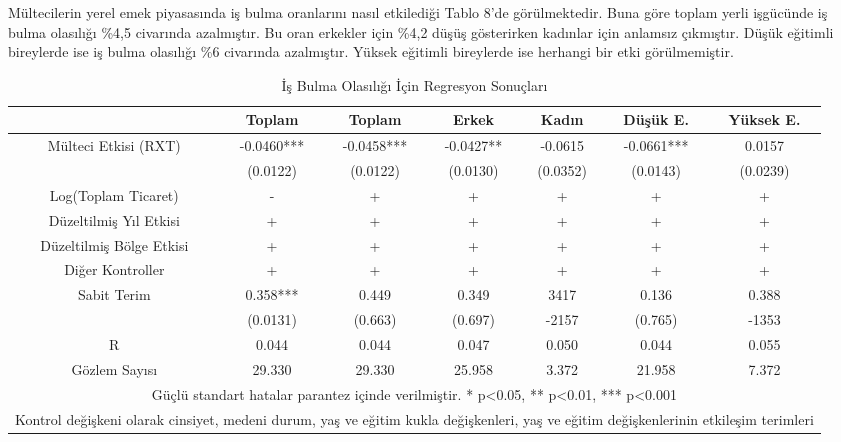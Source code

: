 \documentclass{article}
\begin{document}
\begin{justify}
\begin{table}[h]
\begin{tabular}{|ccccccc|}
                \end{tabular}
        \end{table}
        \FloatBarrier

        Mültecilerin yerel emek piyasasında iş bulma oranlarını nasıl etkilediği Tablo 8'de görülmektedir.
        Buna göre toplam yerli işgücünde iş bulma olasılığı \%4,5 civarında azalmıştır. Bu oran erkekler için
        \%4,2 düşüş gösterirken kadınlar için anlamsız çıkmıştır. Düşük eğitimli bireylerde ise iş bulma olasılığı
        \%6 civarında azalmıştır. Yüksek eğitimli bireylerde ise herhangi bir etki görülmemiştir.

        \FloatBarrier
        \begin{table}[h]
            \centering
            \caption{İş Bulma Olasılığı İçin Regresyon Sonuçları}
            \begin{tabular}{|ccccccc|}
                \hline
                     & Toplam & Toplam & Erkek & Kadın & Düşük E. & Yüksek E. \\ \hline
                     Mülteci Etkisi (RXT) & -0.0460*** & -0.0458*** & -0.0427** & -0.0615 & -0.0661*** & 0.0157 \\ 
                     & (0.0122) & (0.0122) & (0.0130) & (0.0352) & (0.0143) & (0.0239) \\
                    Log(Toplam Ticaret) & - & + & + & + & + & + \\ 
                    Düzeltilmiş Yıl Etkisi & + & + & + & + & + & + \\ 
                    Düzeltilmiş Bölge Etkisi & + & + & + & + & + & + \\ 
                    Diğer Kontroller & + & + & + & + & + & + \\
                    Sabit Terim & 0.358*** & 0.449 & 0.349 & 3417 & 0.136 & 0.388 \\ 
                    & (0.0131) & (0.663) & (0.697) & -2157 & (0.765) & -1353 \\ 
                    R & 0.044 & 0.044 & 0.047 & 0.050 & 0.044 & 0.055 \\ 
                    Gözlem Sayısı & 29.330 & 29.330 & 25.958 & 3.372 & 21.958 & 7.372 \\ \hline
                    \multicolumn{7}{|c|}{\scriptsize Güçlü standart hatalar parantez içinde verilmiştir.   * p<0.05, ** p<0.01, *** p<0.001}\\ \hline
                    \multicolumn{7}{|c|}{\scriptsize Kontrol değişkeni olarak cinsiyet, medeni durum, yaş ve eğitim kukla değişkenleri, yaş ve eğitim değişkenlerinin etkileşim terimleri} \\ 

\end{tabular}
\end{table}
\end{justify}
\end{document}
